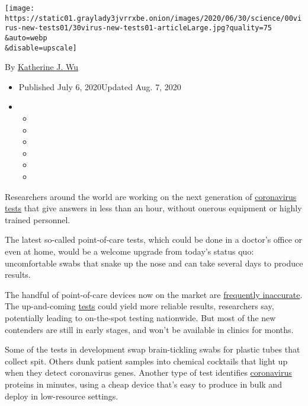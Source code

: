 \texttt{[image: https://static01.graylady3jvrrxbe.onion/images/2020/06/30/science/00virus-new-tests01/30virus-new-tests01-articleLarge.jpg?quality=75\\\&auto=webp\\\&disable=upscale]}

By
\href{https://www.nytimes3xbfgragh.onion/by/katherine-j--wu}{Katherine
J. Wu}

\begin{itemize}
\item
  Published July 6, 2020Updated Aug. 7, 2020
\item
  \begin{itemize}
  \item
  \item
  \item
  \item
  \item
  \item
  \end{itemize}
\end{itemize}

Researchers around the world are working on the next generation of
\href{https://www.nytimes3xbfgragh.onion/2020/08/07/us/covid-test-accuracy-governor-dewine-ohio.html}{coronavirus
tests} that give answers in less than an hour, without onerous equipment
or highly trained personnel.

The latest so-called point-of-care tests, which could be done in a
doctor's office or even at home, would be a welcome upgrade from today's
status quo: uncomfortable swabs that snake up the nose and can take
several days to produce results.

The handful of point-of-care devices now on the market are
\href{https://www.nytimes3xbfgragh.onion/2020/05/13/health/coronavirus-testing-white-house.html}{frequently
inaccurate}. The up-and-coming
\href{https://www.nytimes3xbfgragh.onion/2020/07/15/parenting/kids-covid-19-test.html}{tests}
could yield more reliable results, researchers say, potentially leading
to on-the-spot testing nationwide. But most of the new contenders are
still in early stages, and won't be available in clinics for months.

Some of the tests in development swap brain-tickling swabs for plastic
tubes that collect spit. Others dunk patient samples into chemical
cocktails that light up when they detect coronavirus genes. Another type
of test identifies
\href{https://www.nytimes3xbfgragh.onion/2020/07/15/parenting/kids-covid-19-test.html}{coronavirus}
proteins in minutes, using a cheap device that's easy to produce in bulk
and deploy in low-resource settings.

